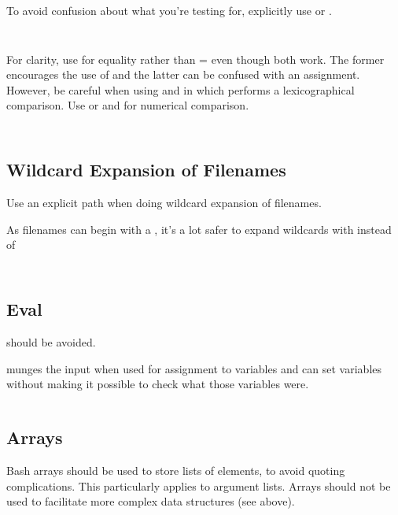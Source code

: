 \documentclass{article}
\begin{document}
To avoid confusion about what you’re testing for, explicitly use  or .

\inputminted[frame=single,firstline=259, lastline=262,linenos]{bash}{./styleguide.bash}

\inputminted[frame=single,firstline=264, lastline=267,linenos]{bash}{./styleguide.bash}

For clarity, use \code{==} for equality rather than = even though both work. The former encourages the use of \code{[[} and the latter can be confused with an assignment. However, be careful when using \code{<} and \code{>} in \code{[[ … ]]} which performs a lexicographical comparison. Use  or  and  for numerical comparison.

\inputminted[frame=single,firstline=269, lastline=280,linenos]{bash}{./styleguide.bash}

\inputminted[frame=single,firstline=282, lastline=291,linenos]{bash}{./styleguide.bash}

\subsection{Wildcard Expansion of Filenames}
\label{subsec:wild_file}
Use an explicit path when doing wildcard expansion of filenames.

As filenames can begin with a \code{-}, it’s a lot safer to expand wildcards with  instead of \code{*}

\inputminted[frame=single,firstline=293, lastline=299,linenos]{bash}{./styleguide.bash}

\inputminted[frame=single,firstline=301, lastline=306,linenos]{bash}{./styleguide.bash}

\subsection{Eval}
\label{subsec:eval}
 should be avoided.

 munges the input when used for assignment to variables and can set variables without making it possible to check what those variables were.

\inputminted[frame=single,firstline=313, lastline=308,linenos]{bash}{./styleguide.bash}

\subsection{Arrays}
\label{subsec:arrays}
Bash arrays should be used to store lists of elements, to avoid quoting complications. This particularly applies to argument lists. Arrays should not be used to facilitate more complex data structures (see  above).
\end{document}
